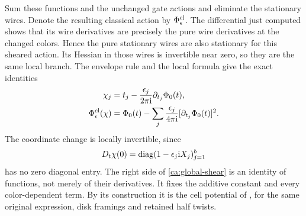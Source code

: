 Sum these functions and the unchanged gate actions and eliminate
the stationary wires. Denote the resulting classical action by
$\Phi_\epsilon^{\rm cl}$. The differential just computed shows that
its wire derivatives are precisely the pure wire derivatives at
the changed colors. Hence the pure stationary wires are also
stationary for this sheared action. Its Hessian in those wires
is invertible near zero, so they are the same local branch.
The envelope rule and the local formula give the exact identities
\begin{align}
 \chi_j&=t_j-\frac{\epsilon_j}{2\pi\mathrm i}
                             \partial_{t_j}\Phi_0(t),\notag\\
 \Phi_\epsilon^{\rm cl}(\chi)
   &=\Phi_0(t)
       -\sum_j\frac{\epsilon_j}{4\pi\mathrm i}
                         [\partial_{t_j}\Phi_0(t)]^2.\label{ca:global-shear}
\end{align}
The coordinate change is locally invertible, since
\[
 D_t\chi(0)=\operatorname{diag}(1-\epsilon_j\mathrm i X_j)_{j=1}^b
\]
has no zero diagonal entry. The right side of
\eqref{ca:global-shear} is an identity of functions, not merely of their
derivatives. It fixes the additive constant and every
color-dependent term. By its construction it is the cell potential
of \cite[Theorem 1.3]{StrictGeometry}, for the same original
expression, disk framings and retained half twists.

